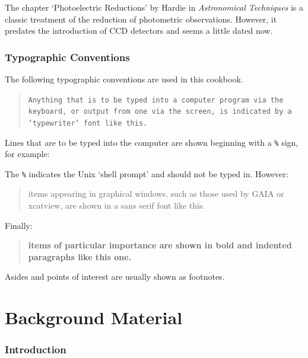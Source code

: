 \documentclass[twoside,11pt,nolof]{starlink}
\begin{document}
The chapter `Photoelectric Reductions' by Hardie in \textit{Astronomical
Techniques}\/\cite{HARDIE62} is a classic treatment of the reduction of
photometric observations.  However, it predates the introduction of CCD
detectors and seems a little dated now.


\section{\label{TYPO}Typographic Conventions}

The following typographic conventions are used in this cookbook.

\begin{quote}
\texttt{Anything that is to be typed into a computer program via the keyboard,
or output from one via the screen, is indicated by a `typewriter' font
like this.}
\end{quote}

Lines that are to be typed into the computer are shown beginning with a
{\tt{\%}} sign, for example:

\begin{terminalv}
\end{terminalv}

The \texttt{\%} indicates the Unix `shell prompt' and should not be
typed in.  However:

\begin{quote}
\textsf{items appearing in graphical windows, such as those used by GAIA
or xcatview, are shown in a sans serif font like this.}
\end{quote}

Finally:

\begin{quote}
\textbf{items of particular importance are shown in bold and indented
paragraphs like this one.}
\end{quote}

Asides and points of interest are usually shown as footnotes.


\cleardoublepage

\part{Background Material}

\section{\label{INTRO_BACK}Introduction}
\end{document}
